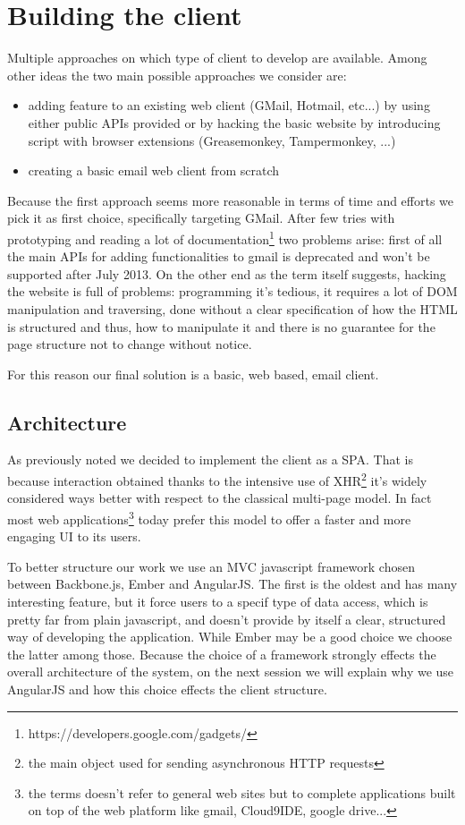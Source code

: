 \documentclass[a4paper,12pt]{report}
\begin{document}
\chapter{Building the client}
Multiple approaches on which type of client to develop are available. Among other ideas the two main possible approaches we consider are:
\begin{itemize}
\item adding feature to an existing web client (GMail, Hotmail, etc...) by using either public APIs provided or by hacking the basic website by introducing script with browser extensions (Greasemonkey, Tampermonkey, ...)
\item creating a basic email web client from scratch
\end{itemize}

Because the first approach seems more reasonable in terms of time and efforts we pick it as first choice, specifically targeting GMail. After few tries with prototyping and reading a lot of documentation\footnote{https://developers.google.com/gadgets/} two problems arise: first of all the main APIs for adding functionalities to gmail is deprecated and won't be supported after July 2013. On the other end as the term itself suggests, hacking the website is full of problems: programming it's tedious, it requires a lot of DOM manipulation and traversing, done without a clear specification of how the HTML is structured and thus, how to manipulate it and there is no guarantee for the page structure not to change without notice.

For this reason our final solution is a basic, web based, email client.

\section{Architecture}
As previously noted we decided to implement the client as a SPA. That is because interaction obtained thanks to the intensive use of XHR\footnote{the main object used for sending asynchronous HTTP requests} it's widely considered ways better with respect to the classical multi-page model. In fact most web applications\footnote{the terms doesn't refer to general web sites but to complete applications built on top of the web platform like gmail, Cloud9IDE, google drive...} today prefer this model to offer a faster and more engaging UI to its users. 

To better structure our work we use an MVC javascript framework chosen between Backbone.js, Ember and AngularJS. The first is the oldest and has many interesting feature, but it force users to a specif type of data access, which is pretty far from plain javascript, and doesn't provide by itself a clear, structured way of developing the application. While Ember may be a good choice we choose the latter among those.
Because the choice of a framework strongly effects the overall architecture of the system, on the next session we will explain why we use AngularJS and how this choice effects the client structure.
\end{document}
